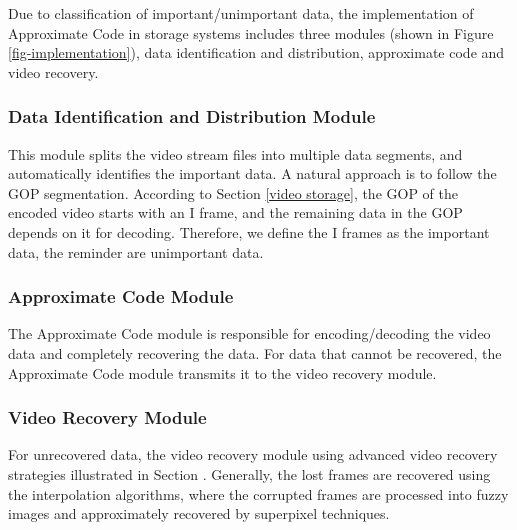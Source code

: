 \documentclass[sigconf]{acmart}
\begin{document}
Due to classification of important/unimportant data, the implementation of Approximate Code in storage systems includes three modules (shown in Figure \ref{fig-implementation}), data identification and distribution, approximate code and video recovery.

\subsubsection{Data Identification and Distribution Module}
This module splits the video stream files into multiple data segments, and automatically identifies the important data. A natural approach is to follow the GOP segmentation. According to Section \ref{video storage}, the GOP of the encoded video starts with an I frame, and the remaining data in the GOP depends on it for decoding. Therefore, we define the I frames as the important data, the reminder are unimportant data.

\subsubsection{Approximate Code Module}
The Approximate Code module is responsible for encoding/decoding the video data and completely recovering the data. For data that cannot be recovered, the Approximate Code module transmits it to the video recovery module.

\subsubsection{Video Recovery Module}
For unrecovered data, the video recovery module using advanced video recovery strategies illustrated in Section \label{video storage}. Generally, the lost frames are recovered using the interpolation algorithms, where the corrupted frames are processed into fuzzy images and approximately recovered by superpixel techniques.
\end{document}

